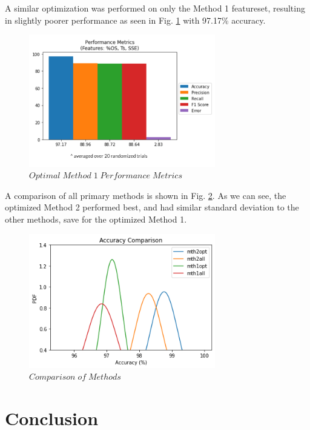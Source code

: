 \documentclass[conference]{IEEEtran}
\begin{document}
A similar optimization was performed on only the Method 1 featureset, resulting in slightly poorer performance as seen in Fig. \ref{fig:M1opt} with 97.17\% accuracy.

\begin{figure}[htb]
\centering
\includegraphics[width=3.2in]{figures/101_m1optperf.png}
\caption{$Optimal\;Method\;1\;Performance\;Metrics$}
\label{fig:M1opt}
\end{figure}

A comparison of all primary methods is shown in Fig. \ref{fig:final}. As we can see, the optimized Method 2 performed best, and had similar standard deviation to the other methods, save for the optimized Method 1.

\begin{figure}[htb]
\centering
\includegraphics[width=3.2in]{figures/102_mth_comp.png}
\caption{$Comparison\;of\;Methods$}
\label{fig:final}
\end{figure}



\section{Conclusion}
\label{sec:concl}
\end{document}
